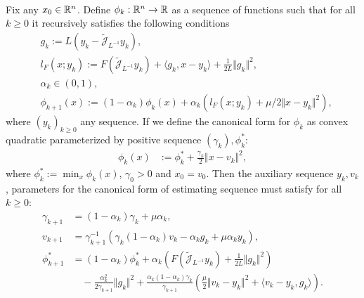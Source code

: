 \documentclass[12pt]{article}
\begin{document}
    \begin{theorem}\label{thm:canon-prox-grad-est-seq}
        \; \\
        Fix any $x_0 \in \mathbb R^n$. 
        Define $\phi_k:\mathbb R^n \rightarrow\mathbb R$ as a sequence of functions such that for all $k\ge 0$ it recursively satisfies the following conditions 
        \begin{align*}
            & g_k := L(y_k - \widetilde{\mathcal J}_{L^{-1}} y_k),
            \\
            & l_F(x; y_k) := 
                F\left(\widetilde{\mathcal J}_{L^{-1}} y_k\right) 
                + \langle g_k, x - y_k\rangle 
                + \frac{1}{2L}\Vert g_k\Vert^2, 
            \\
            & \alpha_k \in (0, 1),
            \\
            & 
            \phi_{k + 1}(x)
            := (1 - \alpha_k)\phi_k (x) + 
            \alpha_k (l_F(x; y_k) + \mu/2\Vert x - y_k\Vert^2), 
        \end{align*}
        where $(y_k)_{k\ge 0}$ any sequence. 
        If we define the canonical form for $\phi_k$ as convex quadratic parameterized by positive sequence $(\gamma_k), \phi_k^*$:  
        \begin{align*}
            \phi_k(x) &:= \phi_k^* + \frac{\gamma_k}{2}\Vert x - v_k\Vert^2, 
        \end{align*}
        where $\phi_k^* := \min_{x} \phi_k(x)$, $\gamma_0 > 0$ and $x_0 = v_0$. 
        Then the auxiliary sequence $y_k, v_k$, parameters for the canonical form of estimating sequence must satisfy for all $k\ge 0$: 
        {\small
        \begin{align*}      
            \gamma_{k + 1} &= (1 - \alpha_k) \gamma_k + \mu \alpha_k,
            \\
            v_{k + 1} &= \gamma_{k + 1}^{-1}
            (\gamma_k(1 - \alpha_k)v_k - \alpha_k g_k + \mu \alpha_k y_k),
            \\
            \phi_{k + 1}^* &= 
            (1 - \alpha_k)\phi_k^*
            + \alpha_k\left(
                F\left(\widetilde{\mathcal J}_{L^{-1}} y_k\right) 
                + \frac{1}{2L}\Vert g_k\Vert^2 
            \right) 
            \\
                &\quad 
                - \frac{\alpha_k^2}{2 \gamma_{k + 1}} \Vert g_k\Vert^2 
                + 
                \frac{\alpha_k(1 - \alpha_k)\gamma_k}{\gamma_{k + 1}} 
                \left(
                    \frac{\mu}{2}\Vert v_k - y_k\Vert^2 
                    + \langle v_k - y_k , g_k\rangle
                \right). 
        \end{align*}
        }
    \end{theorem}
    
\end{document}
